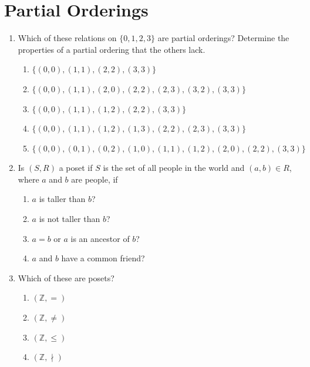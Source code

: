 \documentclass{../../cls/sig-alternate-05-2015}
\begin{document}
\section{Partial Orderings}
\begin{enumerate}
\item Which of these relations on $\{0, 1, 2, 3\}$ are partial orderings? Determine the properties of a partial ordering that
the others lack.
	\begin{enumerate}
		\item $\{(0, 0), (1, 1), (2, 2), (3, 3)\}$ 
		\item $\{(0, 0), (1, 1), (2, 0), (2, 2), (2, 3), (3, 2), (3, 3)\}$
		\item $\{(0, 0), (1, 1), (1, 2), (2, 2), (3, 3)\}$
		\item $\{(0, 0), (1, 1), (1, 2), (1, 3), (2, 2), (2, 3), (3, 3)\}$
		\item $\{(0, 0), (0, 1), (0, 2), (1, 0), (1, 1), (1, 2), (2, 0), (2, 2), (3, 3)\}$
	\end{enumerate}

\item Is $(S,R)$ a poset if $S$ is the set of all people in the world
and $(a, b) \in R$, where $a$ and $b$ are people, if
\begin{enumerate}
	\item $a$ is taller than $b$?
	\item $a$ is not taller than $b$?
	\item $a = b$ or $a$ is an ancestor of $b$?
	\item $a$ and $b$ have a common friend?
\end{enumerate}

\item Which of these are posets?
\begin{enumerate}
	\item $(\mathbb{Z}, =)$
	\item $(\mathbb{Z}, \ne)$
	\item $(\mathbb{Z}, \le)$
	\item $(\mathbb{Z}, \nmid)$
\end{enumerate}


\end{enumerate}
\end{document}
